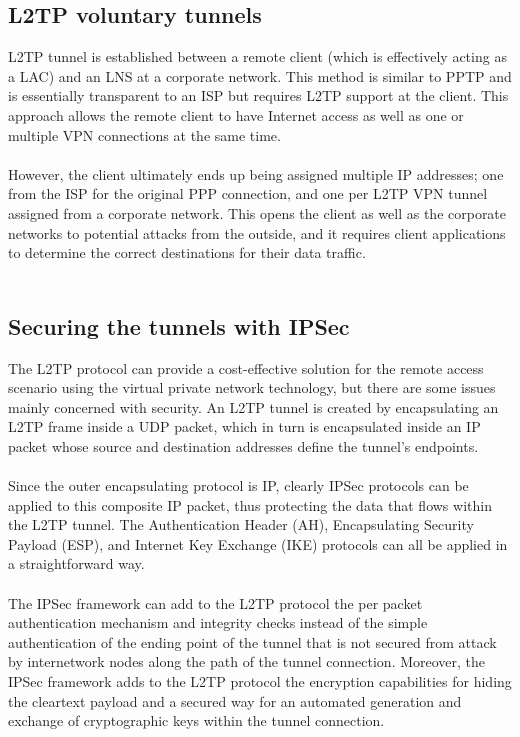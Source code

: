 \documentclass[10pt,a4paper]{article}
\begin{document}
\begin{itemize}
\begin{itemize}
\subsection{L2TP voluntary tunnels}
L2TP tunnel is established between a remote client (which is
effectively acting as a LAC) and an LNS at a corporate network. This method is
similar to PPTP and is essentially transparent to an ISP but requires L2TP
support at the client. This approach allows the remote client to have Internet
access as well as one or multiple VPN connections at the same time. 
\\
\\
However,
the client ultimately ends up being assigned multiple IP addresses; one from the
ISP for the original PPP connection, and one per L2TP VPN tunnel assigned from
a corporate network. This opens the client as well as the corporate networks to
potential attacks from the outside, and it requires client applications to determine
the correct destinations for their data traffic.
\\
\\
\subsection{Securing the tunnels with IPSec}

The L2TP protocol can provide a cost-effective solution for the remote access
scenario using the virtual private network technology, but there are some issues
mainly concerned with security. An L2TP tunnel is created by encapsulating an
L2TP frame inside a UDP packet, which in turn is encapsulated inside an IP
packet whose source and destination addresses define the tunnel's endpoints.
\\
\\
Since the outer encapsulating protocol is IP, clearly
IPSec protocols can be applied to this composite IP packet, thus protecting the
data that flows within the L2TP tunnel. The Authentication Header (AH),
Encapsulating Security Payload (ESP), and Internet Key Exchange (IKE)
protocols can all be applied in a straightforward way.
\\
\\
The IPSec framework can add to the L2TP protocol the per packet authentication
mechanism and integrity checks instead of the simple authentication of the
ending point of the tunnel that is not secured from attack by internetwork nodes
along the path of the tunnel connection. Moreover, the IPSec framework adds to
the L2TP protocol the encryption capabilities for hiding the cleartext payload and
a secured way for an automated generation and exchange of cryptographic keys
within the tunnel connection.
\\
\\
\newpage

\end{itemize}
\end{itemize}
\end{document}
